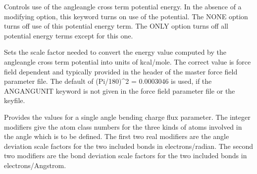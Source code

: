 \documentclass[letterpaper,11pt,english]{sphinxmanual}
\begin{document}
\ignorespaces {}\label{\detokenize{text/keywords:key-angangterm}}\begin{description}
\sphinxAtStartPar
Controls use of the angle\sphinxhyphen{}angle cross term potential energy. In the absence of a modifying option, this keyword turns on use of the potential. The NONE option turns off use of this potential energy term. The ONLY option turns off all potential energy terms except for this one.

\end{description}

\ignorespaces {}\label{\detokenize{text/keywords:key-angangunit}}\begin{description}
\sphinxAtStartPar
Sets the scale factor needed to convert the energy value computed by the angle\sphinxhyphen{}angle cross term potential into units of kcal/mole. The correct value is force field dependent and typically provided in the header of the master force field parameter file. The default of (Pi/180)\textasciicircum{}2 = 0.0003046 is used, if the ANGANGUNIT keyword is not given in the force field parameter file or the keyfile.

\end{description}

\ignorespaces {}\label{\detokenize{text/keywords:key-angcflux}}\begin{description}
\sphinxAtStartPar
Provides the values for a single angle bending charge flux parameter. The integer modifiers give the atom class numbers for the three kinds of atoms involved in the angle which is to be defined. The first two real modifiers are the angle deviation scale factors for the two included bonds in electrons/radian. The second two modifiers are the bond deviation scale factors for the two included bonds in electrons/Angstrom.

\end{description}
\end{document}
